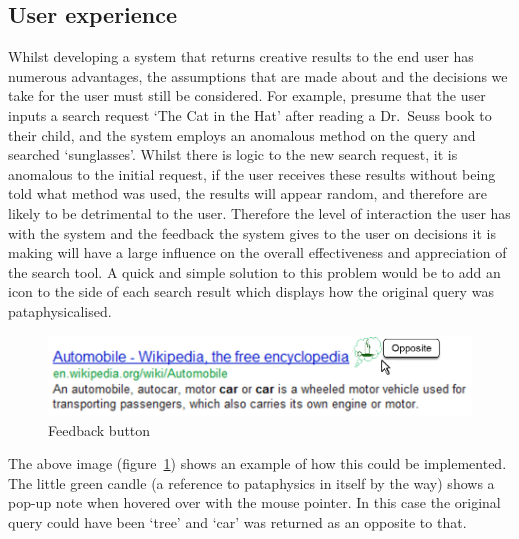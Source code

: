 \begin{draft}
  \section{User experience}

  Whilst developing a system that returns creative results to the end user has numerous advantages, the assumptions that are made about and the decisions we take for the user must still be considered. For example, presume that the user inputs a search request `The Cat in the Hat' after reading a Dr.\ Seuss book to their child, and the system employs an anomalous method on the query and searched `sunglasses'. Whilst there is logic to the new search request, it is anomalous to the initial request, if the user receives these results without being told what method was used, the results will appear random, and therefore are likely to be detrimental to the user. Therefore the level of interaction the user has with the system and the feedback the system gives to the user on decisions it is making will have a large influence on the overall effectiveness and appreciation of the search tool. A quick and simple solution to this problem would be to add an icon to the side of each search result which displays how the original query was pataphysicalised.

  \begin{figure}[htb] %
    \centering
    \includegraphics[width=\linewidth]{images/resultexample}
  \caption[Feedback button]{Feedback button}
  \label{fig:feedback}
  \end{figure}

  The above image (figure~\ref{fig:feedback}) shows an example of how this could be implemented. The little green candle (a reference to pataphysics in itself by the way) shows a pop-up note when hovered over with the mouse pointer. In this case the original query could have been `tree' and `car' was returned as an opposite to that.
\end{draft}



